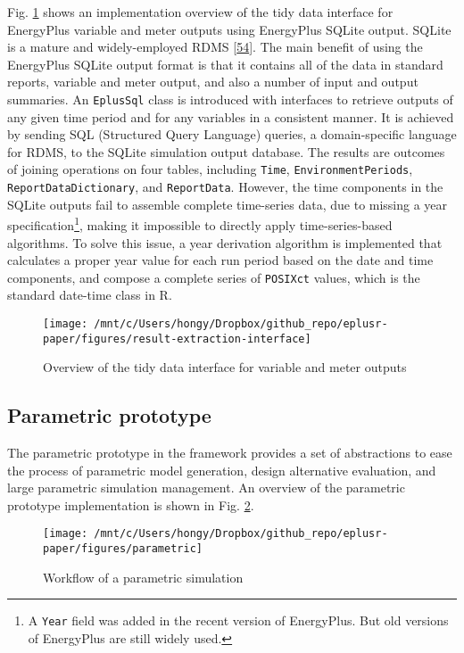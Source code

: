 \documentclass[3p, times]{elsarticle} %
\begin{document}
Fig. \ref{fig:tidy-extractor} shows an implementation overview of the tidy data
interface for EnergyPlus variable and meter outputs using EnergyPlus SQLite
output. SQLite is a mature and widely-employed RDMS {[}\protect\hyperlink{ref-Owens2006}{54}{]}. The main
benefit of using the EnergyPlus SQLite output format is that it contains all of
the data in standard reports, variable and meter output, and also a number of
input and output summaries. An \texttt{EplusSql} class is introduced with interfaces to
retrieve outputs of any given time period and for any variables in a consistent
manner. It is achieved by sending SQL (Structured Query Language) queries, a
domain-specific language for RDMS, to the SQLite simulation output database. The
results are outcomes of joining operations on four tables, including \texttt{Time},
\texttt{EnvironmentPeriods}, \texttt{ReportDataDictionary}, and \texttt{ReportData}. However, the
time components in the SQLite outputs fail to assemble complete time-series
data, due to missing a year specification\footnote{A \texttt{Year} field was added in the recent version of EnergyPlus. But old
  versions of EnergyPlus are still widely used.}, making it impossible to directly
apply time-series-based algorithms. To solve this issue, a year derivation
algorithm is implemented that calculates a proper year value for each run period
based on the date and time components, and compose a complete series of
\texttt{POSIXct} values, which is the standard date-time class in R.

\begin{figure}[!htb]
\texttt{[image: /mnt/c/Users/hongy/Dropbox/github\_repo/eplusr-paper/figures/result-extraction-interface]} \caption{Overview of the tidy data interface for variable and meter outputs}\label{fig:tidy-extractor}
\end{figure}

\hypertarget{sec:eplusr-parametric}{%
\subsection{Parametric prototype}\label{sec:eplusr-parametric}}

The parametric prototype in the framework provides a set of abstractions to ease
the process of parametric model generation, design alternative evaluation, and
large parametric simulation management. An overview of the parametric prototype
implementation is shown in Fig. \ref{fig:parametric}.

\begin{figure}[!htb]
\texttt{[image: /mnt/c/Users/hongy/Dropbox/github\_repo/eplusr-paper/figures/parametric]} \caption{Workflow of a parametric simulation}\label{fig:parametric}
\end{figure}
\end{document}
